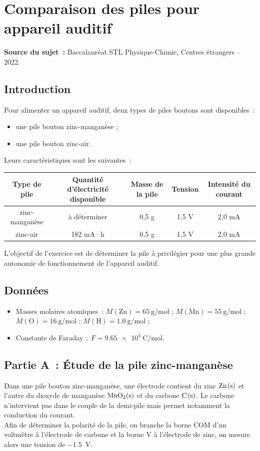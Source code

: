 \section{Comparaison des piles pour appareil auditif}
\textbf{Source du sujet~:} Baccalauréat STL Physique-Chimie, Centres étrangers – 2022.

\subsection{Introduction}
Pour alimenter un appareil auditif, deux types de piles boutons sont disponibles~:
\begin{itemize}
    \item une pile bouton zinc-manganèse ;
    \item une pile bouton zinc-air.
\end{itemize}

Leurs caractéristiques sont les suivantes~:

\begin{center}
\begin{tabular}{|c|c|c|c|c|}
\hline
Type de pile & Quantité d'électricité disponible & Masse de la pile & Tension & Intensité du courant \\
\hline
zinc-manganèse & à déterminer & 0,5 g & 1,5 V & 2,0 mA \\
\hline
zinc-air & 182 mA·h & 0,5 g & 1,5 V & 2,0 mA \\
\hline
\end{tabular}
\end{center}

L'objectif de l'exercice est de déterminer la pile à privilégier pour une plus grande autonomie de fonctionnement de l'appareil auditif.

\subsection{Données}
\begin{itemize}
    \item Masses molaires atomiques~: $M(\mathrm{Zn}) = \SI{65}{\gram\per\mole}$ ; $M(\mathrm{Mn}) = \SI{55}{\gram\per\mole}$ ; $M(\mathrm{O}) = \SI{16}{\gram\per\mole}$ ; $M(\mathrm{H}) = \SI{1,0}{\gram\per\mole}$ ;
    \item Constante de Faraday~: $F = \SI{9,65e4}{\coulomb\per\mole}$.
\end{itemize}

\subsection{Partie A~: Étude de la pile zinc-manganèse}
Dans une pile bouton zinc-manganèse, une électrode contient du zinc $\ce{Zn(s)}$ et l'autre du dioxyde de manganèse $\ce{MnO2(s)}$ et du carbone $\ce{C(s)}$. Le carbone n'intervient pas dans le couple de la demi-pile mais permet notamment la conduction du courant.\\
Afin de déterminer la polarité de la pile, on branche la borne COM d’un voltmètre à
l’électrode de carbone et la borne V à l’électrode de zinc, on mesure alors une tension
de \SI{-1.5}{\volt}.\\

